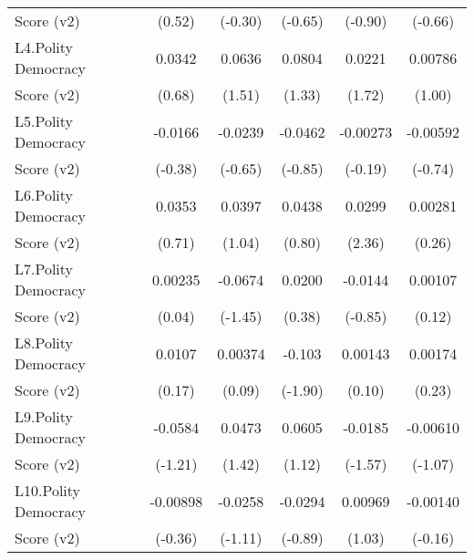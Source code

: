 {\begin{tabular}{l*{5}{c}}
Score (v2)          &      (0.52)         &     (-0.30)         &     (-0.65)         &     (-0.90)         &     (-0.66)         \\
[1em]
L4.Polity Democracy &      0.0342         &      0.0636         &      0.0804         &      0.0221         &     0.00786         \\
Score (v2)          &      (0.68)         &      (1.51)         &      (1.33)         &      (1.72)         &      (1.00)         \\
[1em]
L5.Polity Democracy &     -0.0166         &     -0.0239         &     -0.0462         &    -0.00273         &    -0.00592         \\
Score (v2)          &     (-0.38)         &     (-0.65)         &     (-0.85)         &     (-0.19)         &     (-0.74)         \\
[1em]
L6.Polity Democracy &      0.0353         &      0.0397         &      0.0438         &      0.0299\sym{*}  &     0.00281         \\
Score (v2)          &      (0.71)         &      (1.04)         &      (0.80)         &      (2.36)         &      (0.26)         \\
[1em]
L7.Polity Democracy &     0.00235         &     -0.0674         &      0.0200         &     -0.0144         &     0.00107         \\
Score (v2)          &      (0.04)         &     (-1.45)         &      (0.38)         &     (-0.85)         &      (0.12)         \\
[1em]
L8.Polity Democracy &      0.0107         &     0.00374         &      -0.103         &     0.00143         &     0.00174         \\
Score (v2)          &      (0.17)         &      (0.09)         &     (-1.90)         &      (0.10)         &      (0.23)         \\
[1em]
L9.Polity Democracy &     -0.0584         &      0.0473         &      0.0605         &     -0.0185         &    -0.00610         \\
Score (v2)          &     (-1.21)         &      (1.42)         &      (1.12)         &     (-1.57)         &     (-1.07)         \\
[1em]
L10.Polity Democracy&    -0.00898         &     -0.0258         &     -0.0294         &     0.00969         &    -0.00140         \\
Score (v2)          &     (-0.36)         &     (-1.11)         &     (-0.89)         &      (1.03)         &     (-0.16)         \\

\end{tabular}}
